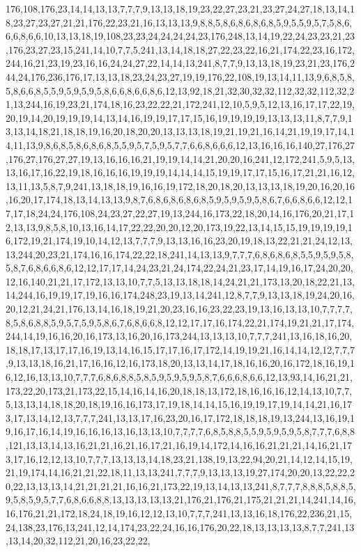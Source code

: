 176,108,176,23,14,14,13,13,7,7,7,9,13,13,18,19,23,22,27,23,21,23,27,24,27,18,13,14,18,23,27,23,27,21,21,176,22,23,21,16,13,13,13,9,8,8,5,8,6,8,6,8,6,8,5,9,5,5,9,5,7,5,8,6,6,6,8,6,6,10,13,13,18,19,108,23,23,24,24,24,24,23,176,248,13,14,19,22,24,23,23,21,23,176,23,27,23,15,241,14,10,7,7,5,241,13,14,18,18,27,22,23,22,16,21,174,22,23,16,172,244,16,21,23,19,23,16,16,24,24,27,22,14,14,13,241,8,7,7,9,13,13,18,19,23,21,23,176,244,24,176,236,176,17,13,13,18,23,24,23,27,19,19,176,22,108,19,13,14,11,13,9,6,8,5,8,5,8,6,6,8,5,5,9,5,9,5,9,5,8,6,6,8,6,6,8,6,12,13,92,18,21,32,30,32,32,112,32,32,112,32,21,13,244,16,19,23,21,174,18,16,23,22,22,21,172,241,12,10,5,9,5,12,13,16,17,17,22,19,20,19,14,20,19,19,19,14,13,14,16,19,19,17,17,15,16,19,19,19,19,13,13,13,11,8,7,7,9,13,13,14,18,21,18,18,19,16,20,18,20,20,13,13,13,18,19,21,19,21,16,14,21,19,19,17,14,14,11,13,9,8,6,8,5,8,6,8,6,8,5,5,9,5,7,5,9,5,7,7,6,6,8,6,6,6,12,13,16,16,16,140,27,176,27,176,27,176,27,27,19,13,16,16,16,21,19,19,14,14,21,20,20,16,241,12,172,241,5,9,5,13,13,16,17,16,22,19,18,16,16,16,19,19,19,14,14,14,15,19,19,17,17,15,16,17,21,21,16,12,13,11,13,5,8,7,9,241,13,18,18,19,16,16,19,172,18,20,18,20,13,13,13,18,19,20,16,20,16,16,20,17,174,18,13,14,13,13,9,8,7,6,8,6,8,6,8,6,8,5,9,5,9,5,9,5,8,6,7,6,6,8,6,6,12,12,17,17,18,24,24,176,108,24,23,27,22,27,19,13,244,16,173,22,18,20,14,16,176,20,21,17,12,13,13,9,8,5,8,10,13,16,14,17,22,22,20,20,12,20,173,19,22,13,14,15,15,19,19,19,19,16,172,19,21,174,19,10,14,12,13,7,7,7,9,13,13,16,16,23,20,19,18,13,22,21,21,24,12,13,13,244,20,23,21,174,16,16,174,22,22,18,241,14,13,13,9,7,7,7,6,8,6,8,6,8,5,5,9,5,9,5,8,5,8,7,6,8,6,6,8,6,12,12,17,17,14,24,23,21,24,174,22,24,21,23,17,14,19,16,17,24,20,20,12,16,140,21,21,17,172,13,13,10,7,7,5,13,13,18,18,14,24,21,21,173,13,20,18,22,21,13,14,244,16,19,19,17,19,16,16,174,248,23,19,13,14,241,12,8,7,7,9,13,13,18,19,24,20,16,20,12,21,24,21,176,13,14,16,18,19,21,20,23,16,16,23,22,23,19,13,16,13,13,10,7,7,7,7,8,5,8,6,8,8,5,9,5,7,5,9,5,8,6,7,6,8,6,6,8,12,12,17,17,16,174,22,21,174,19,21,21,17,174,244,14,19,16,16,20,16,173,13,16,20,16,173,244,13,13,13,10,7,7,7,241,13,16,18,16,20,18,18,17,13,17,17,16,19,13,14,16,15,17,17,16,17,172,14,19,19,21,16,14,14,12,12,7,7,7,9,13,13,18,16,21,17,16,16,12,16,173,18,20,13,13,14,17,18,16,16,20,16,172,18,16,19,16,12,16,13,13,10,7,7,7,6,8,6,8,8,5,8,5,9,5,9,5,9,5,8,7,6,6,6,8,6,6,12,13,93,14,16,21,21,173,22,20,173,21,173,22,15,14,16,14,16,20,18,18,13,172,18,16,16,16,12,14,13,10,7,7,5,13,13,14,18,18,20,18,19,16,16,173,17,19,18,14,14,15,16,19,19,17,19,14,14,21,16,173,17,13,14,12,13,7,7,7,241,13,13,17,16,23,20,16,17,172,18,18,18,19,13,244,13,16,19,19,16,17,16,14,19,16,16,16,13,16,13,13,10,7,7,7,7,6,8,5,8,8,5,5,9,5,9,5,9,5,8,7,7,7,6,8,8,121,13,13,14,13,16,21,21,16,21,16,17,21,16,19,14,172,14,16,16,21,21,21,14,16,21,173,17,16,12,12,13,10,7,7,7,13,13,13,14,18,23,21,138,19,13,22,94,20,21,14,12,14,15,19,21,19,174,14,16,21,21,22,18,11,13,13,241,7,7,7,9,13,13,13,19,27,174,20,20,13,22,22,20,22,13,13,13,14,21,21,21,21,16,16,21,173,22,19,13,14,13,13,241,8,7,7,7,8,8,8,5,8,8,5,9,5,8,5,9,5,7,7,6,8,6,6,8,8,13,13,13,13,13,21,176,21,176,21,175,21,21,21,14,241,14,16,16,176,21,21,172,18,24,18,19,16,12,12,13,10,7,7,7,241,13,13,16,18,176,22,236,21,15,24,138,23,176,13,241,12,14,174,23,22,24,16,16,176,20,22,18,13,13,13,13,8,7,7,241,13,13,14,20,32,112,21,20,16,23,22,22,